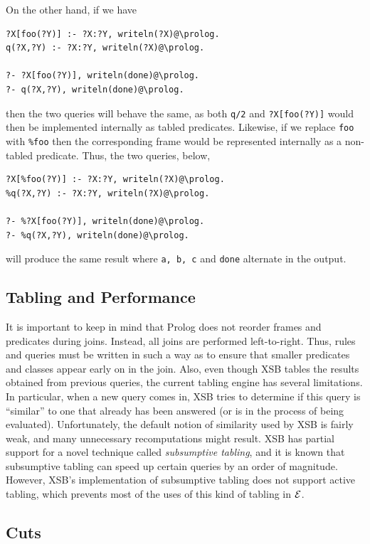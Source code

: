 \documentclass[11pt]{article}
\newcommand{\ERGO}{\mbox{\ensuremath{\cal{E}}\smaller{{\sc{RGO}}}}\xspace}
\newcommand{\FLSYSTEM}{\ERGO}
\begin{document}
On the other hand, if we have
\begin{verbatim}
?X[foo(?Y)] :- ?X:?Y, writeln(?X)@\prolog.
q(?X,?Y) :- ?X:?Y, writeln(?X)@\prolog.

?- ?X[foo(?Y)], writeln(done)@\prolog.
?- q(?X,?Y), writeln(done)@\prolog.
\end{verbatim}
then the two queries will behave the same, as both {\tt q/2} and
\verb|?X[foo(?Y)]| would then be implemented internally as tabled predicates.
Likewise, if we replace {\tt foo} with {\tt \%foo} then the corresponding
frame would be represented internally as a non-tabled predicate.
Thus, the two queries, below,
\begin{verbatim}
?X[%foo(?Y)] :- ?X:?Y, writeln(?X)@\prolog.
%q(?X,?Y) :- ?X:?Y, writeln(?X)@\prolog.

?- %?X[foo(?Y)], writeln(done)@\prolog.
?- %q(?X,?Y), writeln(done)@\prolog.
\end{verbatim}
will produce the same result where \texttt{a, b, c} and \texttt{done}
alternate in the output.

\subsection{Tabling and Performance}

It is important to keep in mind that Prolog does not reorder frames
and predicates during joins. Instead, all joins are performed
left-to-right.  Thus, rules and queries must be written in such a way as to
ensure that smaller predicates and classes appear early on in the join.
Also, even though XSB tables the results obtained from previous queries,
the current tabling engine has several limitations. In particular, when a
new query comes in, XSB tries to determine if this query is ``similar'' to
one that already has been answered (or is in the process of being
evaluated).  Unfortunately, the default notion of similarity used by XSB is
fairly weak, and many unnecessary recomputations might result. XSB has
partial support for a
novel technique called \emph{subsumptive tabling}, and
it is known that subsumptive tabling can speed up
certain queries by an order of magnitude. However, XSB's implementation
of subsumptive tabling does not support active tabling, which prevents
most of the uses of this kind of tabling in \FLSYSTEM.


\subsection{Cuts}
\end{document}
